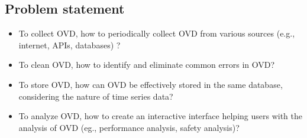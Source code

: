 


\subsection{Problem statement}
\begin{itemize}
\item To collect OVD, how to periodically collect OVD from various sources (e.g., internet, APIs, databases) ?
\item To clean OVD, how to identify and eliminate common errors in OVD?
\item To store OVD, how can OVD be effectively stored in the same database, considering the nature of time series data?
\item To analyze OVD, how to create an interactive interface helping users with the analysis of OVD (eg.,
performance analysis, safety analysis)?
\end{itemize}


